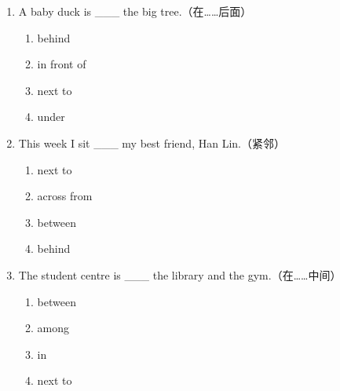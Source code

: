 \documentclass[11pt,a4paper]{ctexart}
\begin{document}
\begin{enumerate}[leftmargin=*,itemsep=4pt]
\begin{enumerate}[label=\Alph*.,leftmargin=2em,itemsep=1pt,topsep=2pt]
\end{enumerate}
\item A baby duck is \_\_\_ the big tree.（在……后面）
\begin{enumerate}[label=\Alph*.,leftmargin=2em,itemsep=1pt,topsep=2pt]
\item behind
\item in front of
\item next to
\item under
\end{enumerate}
\item This week I sit \_\_\_ my best friend, Han Lin.（紧邻）
\begin{enumerate}[label=\Alph*.,leftmargin=2em,itemsep=1pt,topsep=2pt]
\item next to
\item across from
\item between
\item behind
\end{enumerate}
\item The student centre is \_\_\_ the library and the gym.（在……中间）
\begin{enumerate}[label=\Alph*.,leftmargin=2em,itemsep=1pt,topsep=2pt]
\item between
\item among
\item in
\item next to
\end{enumerate}
\end{enumerate}
\end{document}
